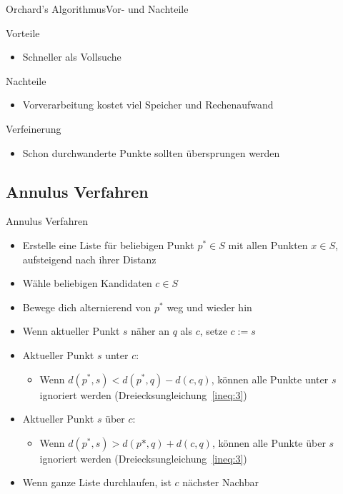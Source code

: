 \documentclass{beamer}
\begin{document}
\begin{frame}{Orchard’s Algorithmus}{Vor- und Nachteile}
 \begin{block}{Vorteile}
  \begin{itemize}
   \item Schneller als Vollsuche
  \end{itemize}
 \end{block}
 \pause
 \begin{block}{Nachteile}
  \begin{itemize}
   \item Vorverarbeitung kostet viel Speicher und Rechenaufwand
  \end{itemize}
 \end{block}
 \pause
 \begin{block}{Verfeinerung}
  \begin{itemize}
   \item Schon durchwanderte Punkte sollten übersprungen werden
  \end{itemize}
 \end{block}
\end{frame}

\subsection{Annulus Verfahren}
\begin{frame}{Annulus Verfahren}
 \begin{itemize}
  \item Erstelle eine Liste für beliebigen Punkt $p^* \in S$ mit allen Punkten $x \in S$, aufsteigend nach ihrer Distanz
  \pause
  \item Wähle beliebigen Kandidaten $c \in S$
  \pause
  \item Bewege dich alternierend von $p^*$ weg und wieder hin
  \pause
  \item Wenn aktueller Punkt $s$ näher an $q$ als $c$, setze $c:= s$
  \pause
  \item Aktueller Punkt $s$ unter $c$:
  \begin{itemize}
   \item Wenn $d(p^*, s) < d(p^*, q) - d(c, q)$, können alle Punkte unter $s$ ignoriert werden (Dreiecksungleichung~\ref{ineq:3})
  \end{itemize}
  \pause
  \item Aktueller Punkt $s$ über $c$:
  \begin{itemize}
   \item Wenn $d(p^*, s) > d(p*, q) + d(c, q)$, können alle Punkte über $s$ ignoriert werden (Dreiecksungleichung~\ref{ineq:3})
  \end{itemize}
  \pause
  \item Wenn ganze Liste durchlaufen, ist $c$ nächster Nachbar
 \end{itemize}
\end{frame}
\end{document}

